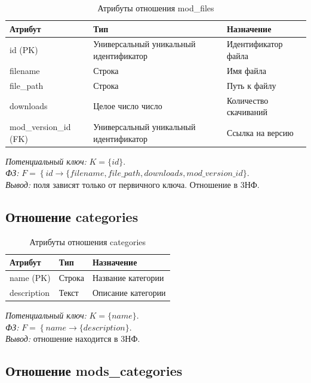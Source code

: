 \begin{table}[H]
	\centering
	\caption{Атрибуты отношения mod\_files}
	\label{tab:mod_files}
	\begin{tabularx}{\textwidth}{|l|X|l|}
		\hline
		\textbf{Атрибут} & \textbf{Тип} & \textbf{Назначение} \\
		\hline
		id (PK) & Универсальный уникальный идентификатор &  Идентификатор файла \\
		\hline
		filename & Строка & Имя файла \\
		\hline
		file\_path & Строка & Путь к файлу \\
		\hline
		downloads & Целое число число & Количество скачиваний \\
		\hline
		mod\_version\_id (FK)& Универсальный уникальный идентификатор & Ссылка на версию \\
		\hline
	\end{tabularx}
\end{table}

\textit{Потенциальный ключ:} $K = \{id\}$. \\
\textit{ФЗ:} $F = \left\{ id \rightarrow \{filename, file\_path, downloads, mod\_version\_id\}. \right.$ \\
\textit{Вывод:} поля зависят только от первичного ключа. Отношение в 3НФ.

\subsection*{Отношение categories}

\begin{table}[H]
	\centering
	\caption{Атрибуты отношения categories}
	\label{tab:categories}
	\begin{tabularx}{\textwidth}{|X|X|X|}
		\hline
		\textbf{Атрибут} & \textbf{Тип} & \textbf{Назначение} \\
		\hline
		name (PK) & Строка & Название категории \\
		\hline
		description & Текст & Описание категории \\
		\hline
	\end{tabularx}
\end{table}

\textit{Потенциальный ключ:} $K = \{name\}$. \\
\textit{ФЗ:} $F = \left\{ name \rightarrow \{description\}. \right.$ \\
\textit{Вывод:} отношение находится в 3НФ.

\subsection*{Отношение mods\_categories}

